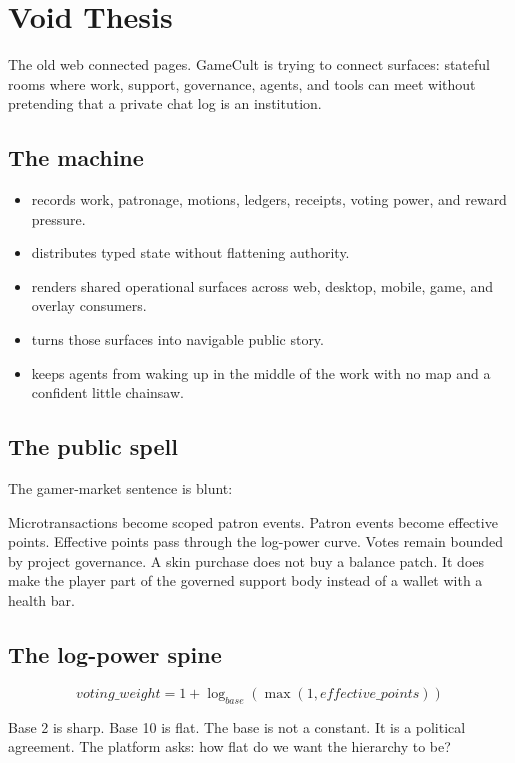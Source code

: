 \chapter{Void Thesis}

The old web connected pages. GameCult is trying to connect surfaces: stateful rooms where work, support, governance, agents, and tools can meet without pretending that a private chat log is an institution.


\section{The machine}

\begin{itemize}
  \item {} records work, patronage, motions, ledgers, receipts, voting power, and reward pressure.
  \item {} distributes typed state without flattening authority.
  \item {} renders shared operational surfaces across web, desktop, mobile, game, and overlay consumers.
  \item {} turns those surfaces into navigable public story.
  \item {} keeps agents from waking up in the middle of the work with no map and a confident little chainsaw.
\end{itemize}

\section{The public spell}

The gamer-market sentence is blunt:

\begin{center}
\end{center}

Microtransactions become scoped patron events. Patron events become effective points. Effective points pass through the log-power curve. Votes remain bounded by project governance. A skin purchase does not buy a balance patch. It does make the player part of the governed support body instead of a wallet with a health bar.

\section{The log-power spine}

\[
  voting\_weight = 1 + \log_{base}(\max(1, effective\_points))
\]

Base 2 is sharp. Base 10 is flat. The base is not a constant. It is a political agreement. The platform asks: how flat do we want the hierarchy to be?

